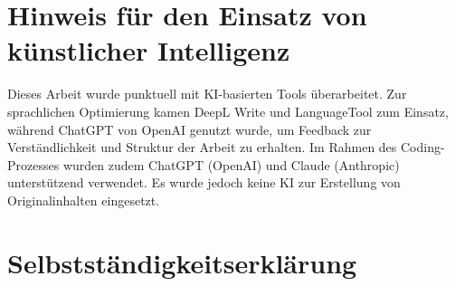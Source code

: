 \documentclass{template}
\begin{document}
\begingroup
  \let\clearpage\relax
  \let\cleardoublepage\relax
  \listoffigures
  \listoftables
\endgroup


\clearpage
{}




\clearpage



\clearpage



\clearpage



\clearpage



\clearpage



\clearpage



\clearpage


\clearpage
\printglossary[label=sec:glossary]



\clearpage
{}
\printbibliography[heading=bibintoc, title=Literaturverzeichnis]

\clearpage

\section*{Hinweis für den Einsatz von künstlicher Intelligenz}

Dieses Arbeit wurde punktuell mit KI-basierten Tools überarbeitet. Zur sprachlichen Optimierung kamen DeepL Write und LanguageTool zum Einsatz, während ChatGPT von OpenAI genutzt wurde, um Feedback zur Verständlichkeit und Struktur der Arbeit zu erhalten. Im Rahmen des Coding-Prozesses wurden zudem ChatGPT (OpenAI) und Claude (Anthropic) unterstützend verwendet. Es wurde jedoch keine KI zur Erstellung von Originalinhalten eingesetzt.


\clearpage

\section*{Selbstständigkeitserklärung}
\end{document}
